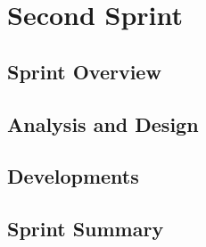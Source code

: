 \chapter{Second Sprint}\label{chap:sprint2}

\section{Sprint Overview}\label{sec:sprint2:overview}


\section{Analysis and Design}\label{sec:sprint2:analysis}





\section{Developments}\label{sec:sprint2:developments}


\section{Sprint Summary}\label{sec:sprint2:review}

